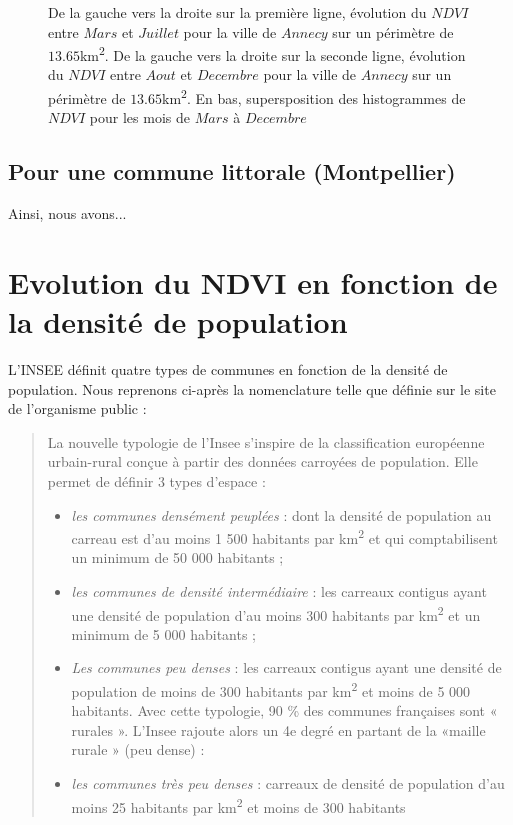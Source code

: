 \documentclass{book}
\begin{document}
\begin{figure}[H]
\begin{center}
\end{center}
\caption{De la gauche vers la droite sur la première ligne, évolution du $NDVI$ entre $Mars$ et $Juillet$ pour la ville de $Annecy$ sur un périmètre de $13.65$km\textsuperscript{2}.
De la gauche vers la droite sur la seconde ligne, évolution du $NDVI$ entre $Aout$ et $Decembre$ pour la ville de $Annecy$ sur un périmètre de $13.65$km\textsuperscript{2}. 
En bas, supersposition des histogrammes de $NDVI$ pour les mois de $Mars$ à $Decembre$}
\label{fontainebleau_ndvi_annee}
\end{figure}

\clearpage

\section{Pour une commune littorale (Montpellier)}

\clearpage

Ainsi, nous avons...

\chapter{Evolution du NDVI en fonction de la densité de population}

L'INSEE définit quatre types de communes en fonction de la densité de population. Nous reprenons ci-après la nomenclature telle que définie sur le
site de l'organisme public :\\
\begin{quotation}

\Large{
La nouvelle typologie de l’Insee s’inspire de la classification européenne urbain-rural conçue à partir des données carroyées de population. 
Elle permet de définir 3 types d’espace :

\begin{itemize}
\item \emph{les communes densément peuplées} : dont la densité de population au carreau est d’au moins 1 500 habitants par km\textsuperscript{2} 
et qui comptabilisent un minimum de 50 000 habitants ;

\item \emph{les communes de densité intermédiaire} : les carreaux contigus ayant une densité de population d’au moins 300 habitants par km\textsuperscript{2} 
et un minimum de 5 000 habitants ;

\item \emph{Les communes peu denses} : les carreaux contigus ayant une densité de population de moins de 300 habitants par km\textsuperscript{2} et moins de 5 000 habitants.
Avec cette typologie, 90 \% des communes françaises sont « rurales ». L’Insee rajoute alors un 4e degré en partant de la «maille rurale » (peu dense) :

\item \emph{les communes très peu denses} : carreaux de densité de population d’au moins 25 habitants par km\textsuperscript{2} et moins de 300 habitants
\end{itemize}
}

\end{quotation}

\backmatter

\listoftables

\listoffigures



\end{document}
